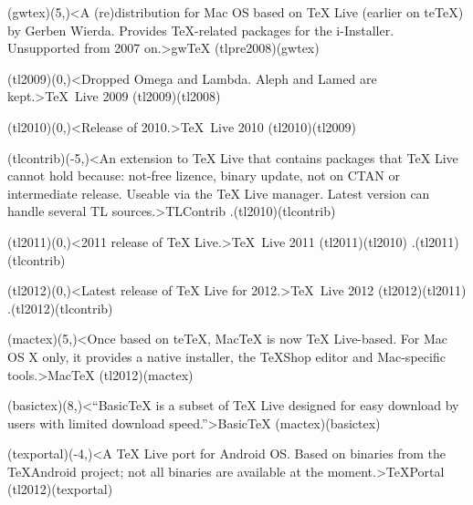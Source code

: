{	\tonode[\histdistro](gwtex)(5,\layer)<A (re)distribution for Mac OS based on TeX Live (earlier on teTeX) by Gerben Wierda. Provides TeX-related packages for the i-Installer. Unsupported from 2007 on.>{gw\TeX}
	\todraw(tlpre2008)(gwtex)

	\steplayer

	\tonode(tl2009)(0,\layer)<Dropped Omega and Lambda. Aleph and Lamed are kept.>{\TeX\ Live 2009}
	\todraw(tl2009)(tl2008)
	\steplayer

	\tonode(tl2010)(0,\layer)<Release of 2010.>{\TeX\ Live 2010}
	\todraw(tl2010)(tl2009)


	\tonode(tlcontrib)(-5,\layer)<An extension to TeX Live that contains packages that TeX Live cannot hold because: not-free lizence, binary update, not on CTAN or intermediate release. Useable via the TeX Live manager. Latest version can handle several TL sources.>{TLContrib}
	\todraw.(tl2010)(tlcontrib)
	\steplayer

	\tonode(tl2011)(0,\layer)<2011 release of TeX Live.>{\TeX~Live 2011}
	\todraw(tl2011)(tl2010)
	\todraw.(tl2011)(tlcontrib)

	\steplayer

	\tonode(tl2012)(0,\layer)<Latest release of TeX Live for 2012.>{\TeX~Live 2012}
	\todraw(tl2012)(tl2011)
	\todraw.(tl2012)(tlcontrib)

	\tonode(mactex)(5,\layer)<Once based on teTeX, MacTeX is now TeX Live-based. For Mac OS X only, it provides a native installer, the TeXShop editor and Mac-specific tools.>{Mac\TeX}
	\todraw(tl2012)(mactex)

	\tonode(basictex)(8,\layer)<“BasicTeX is a subset of TeX Live designed for easy download by users with limited download speed.”>{Basic\TeX}
	\todraw(mactex)(basictex)

	\tonode(texportal)(-4,\layer)<A TeX Live port for Android OS. Based on binaries from the TeXAndroid project; not all binaries are available at the moment.>{\TeX Portal}
	\todraw(tl2012)(texportal)
}

